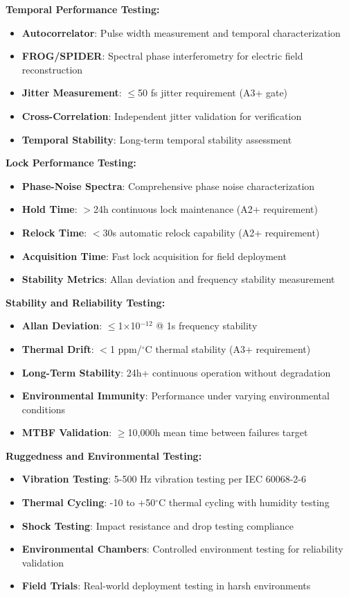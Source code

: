 \documentclass[11pt,a4paper]{article}
\begin{document}
\textbf{Temporal Performance Testing:}
\begin{itemize}
\item \textbf{Autocorrelator}: Pulse width measurement and temporal characterization
\item \textbf{FROG/SPIDER}: Spectral phase interferometry for electric field reconstruction
\item \textbf{Jitter Measurement}: $\leq$50 fs jitter requirement (A3+ gate)
\item \textbf{Cross-Correlation}: Independent jitter validation for verification
\item \textbf{Temporal Stability}: Long-term temporal stability assessment
\end{itemize}

\textbf{Lock Performance Testing:}
\begin{itemize}
\item \textbf{Phase-Noise Spectra}: Comprehensive phase noise characterization
\item \textbf{Hold Time}: $>$24h continuous lock maintenance (A2+ requirement)
\item \textbf{Relock Time}: $<$30s automatic relock capability (A2+ requirement)
\item \textbf{Acquisition Time}: Fast lock acquisition for field deployment
\item \textbf{Stability Metrics}: Allan deviation and frequency stability measurement
\end{itemize}

\textbf{Stability and Reliability Testing:}
\begin{itemize}
\item \textbf{Allan Deviation}: $\leq$1$\times$10$^{-12}$ @ 1s frequency stability
\item \textbf{Thermal Drift}: $<$1 ppm/$^\circ$C thermal stability (A3+ requirement)
\item \textbf{Long-Term Stability}: 24h+ continuous operation without degradation
\item \textbf{Environmental Immunity}: Performance under varying environmental conditions
\item \textbf{MTBF Validation}: $\geq$10,000h mean time between failures target
\end{itemize}

\textbf{Ruggedness and Environmental Testing:}
\begin{itemize}
\item \textbf{Vibration Testing}: 5-500 Hz vibration testing per IEC 60068-2-6
\item \textbf{Thermal Cycling}: -10 to +50$^\circ$C thermal cycling with humidity testing
\item \textbf{Shock Testing}: Impact resistance and drop testing compliance
\item \textbf{Environmental Chambers}: Controlled environment testing for reliability validation
\item \textbf{Field Trials}: Real-world deployment testing in harsh environments
\end{itemize}
\end{document}
